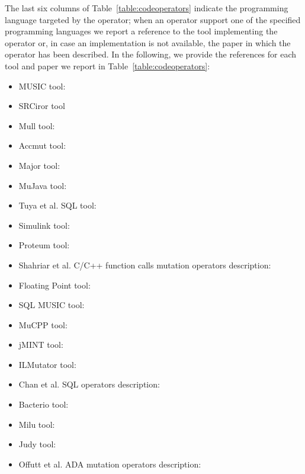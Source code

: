 
The last six columns of Table~\ref{table:codeoperators} indicate the programming language targeted by the operator; when an operator support one of the specified programming languages we report a reference to the tool implementing the operator or, in case an implementation is not available, the paper in which the operator has been described. In the following, we provide the references for each tool and paper we report in Table~\ref{table:codeoperators}:

\begin{itemize}
	\item MUSIC tool: \cite{phan2018music}
	\item SRCiror tool\cite{hariri2018srciror}
	\item Mull tool: \cite{denisov2018mull}
	\item Accmut tool: \cite{wang2017faster}
	\item Major tool: \cite{just2014major}
	\item MuJava tool: \cite{ma2006mujava}
	\item Tuya et al. SQL tool: \cite{tuya2007mutating}
	\item Simulink tool: \cite{binh2012mutation}
	\item Proteum tool: \cite{delamaro2001interface}
	\item Shahriar et al. C/C++ function calls mutation operators description: \cite{shahriar2008mutation} %
	\item Floating Point tool: \cite{dan2012semantic}
	\item SQL MUSIC tool: \cite{shahriar2008music}
	\item MuCPP tool: \cite{delgado2017assessment}
	\item jMINT tool: \cite{grechanik2016mutation}
	\item ILMutator tool: \cite{derezinska2011object}
	\item Chan et al. SQL operators description: \cite{chan2005fault}
	\item Bacterio tool: \cite{mateo2012validating}
	\item Milu tool: \cite{jia2008milu}
	\item Judy tool: \cite{madeyski2010judy}
	\item Offutt et al. ADA mutation operators description: \cite{rothermel1996experimental} 
\end{itemize}

